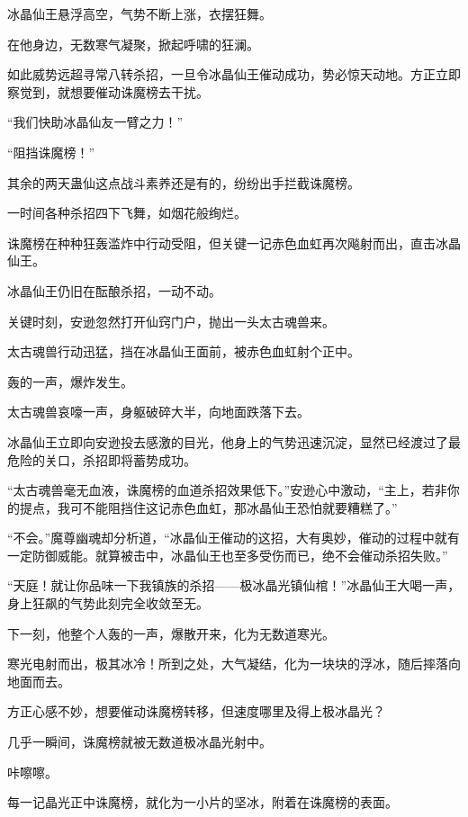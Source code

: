 
\begin{this_body}



冰晶仙王悬浮高空，气势不断上涨，衣摆狂舞。

在他身边，无数寒气凝聚，掀起呼啸的狂澜。

如此威势远超寻常八转杀招，一旦令冰晶仙王催动成功，势必惊天动地。方正立即察觉到，就想要催动诛魔榜去干扰。

“我们快助冰晶仙友一臂之力！”

“阻挡诛魔榜！”

其余的两天蛊仙这点战斗素养还是有的，纷纷出手拦截诛魔榜。

一时间各种杀招四下飞舞，如烟花般绚烂。

诛魔榜在种种狂轰滥炸中行动受阻，但关键一记赤色血虹再次飚射而出，直击冰晶仙王。

冰晶仙王仍旧在酝酿杀招，一动不动。

关键时刻，安逊忽然打开仙窍门户，抛出一头太古魂兽来。

太古魂兽行动迅猛，挡在冰晶仙王面前，被赤色血虹射个正中。

轰的一声，爆炸发生。

太古魂兽哀嚎一声，身躯破碎大半，向地面跌落下去。

冰晶仙王立即向安逊投去感激的目光，他身上的气势迅速沉淀，显然已经渡过了最危险的关口，杀招即将蓄势成功。

“太古魂兽毫无血液，诛魔榜的血道杀招效果低下。”安逊心中激动，“主上，若非你的提点，我可不能阻挡住这记赤色血虹，那冰晶仙王恐怕就要糟糕了。”

“不会。”魔尊幽魂却分析道，“冰晶仙王催动的这招，大有奥妙，催动的过程中就有一定防御威能。就算被击中，冰晶仙王也至多受伤而已，绝不会催动杀招失败。”

“天庭！就让你品味一下我镇族的杀招——极冰晶光镇仙棺！”冰晶仙王大喝一声，身上狂飙的气势此刻完全收敛至无。

下一刻，他整个人轰的一声，爆散开来，化为无数道寒光。

寒光电射而出，极其冰冷！所到之处，大气凝结，化为一块块的浮冰，随后摔落向地面而去。

方正心感不妙，想要催动诛魔榜转移，但速度哪里及得上极冰晶光？

几乎一瞬间，诛魔榜就被无数道极冰晶光射中。

咔嚓嚓。

每一记晶光正中诛魔榜，就化为一小片的坚冰，附着在诛魔榜的表面。


\end{this_body}
